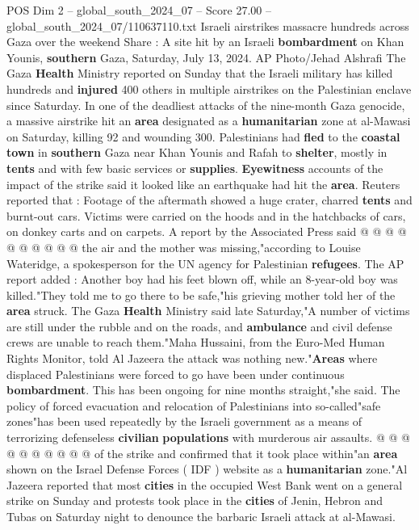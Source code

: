 \begin{textsample}{POS Dim 2 – global\_south\_2024\_07 – Score 27.00 – global\_south\_2024\_07/110637110.txt}  \label{ex:f2_pos_164}
Israeli airstrikes massacre hundreds across Gaza over the weekend Share : A site hit by an Israeli \textbf{bombardment} on Khan Younis, \textbf{southern} Gaza, Saturday, July 13, 2024.
AP Photo/Jehad Alshrafi The Gaza \textbf{Health} Ministry reported on Sunday that the Israeli military has killed hundreds and \textbf{injured} 400 others in multiple airstrikes on the Palestinian enclave since Saturday.
In one of the deadliest attacks of the nine-month Gaza genocide, a massive airstrike hit an \textbf{area} designated as a \textbf{humanitarian} zone at al-Mawasi on Saturday, killing 92 and wounding 300.
Palestinians had \textbf{fled} to the \textbf{coastal} \textbf{town} in \textbf{southern} Gaza near Khan Younis and Rafah to \textbf{shelter}, mostly in \textbf{tents} and with few basic services or \textbf{supplies}. \textbf{Eyewitness} accounts of the impact of the strike said it looked like an earthquake had hit the \textbf{area}.
Reuters reported that : Footage of the aftermath showed a huge crater, charred \textbf{tents} and burnt-out cars.
Victims were carried on the hoods and in the hatchbacks of cars, on donkey carts and on carpets.
A report by the Associated Press said @ @ @ @ @ @ @ @ @ @ the air and the mother was missing,"according to Louise Wateridge, a spokesperson for the UN agency for Palestinian \textbf{refugees}.
The AP report added : Another boy had his feet blown off, while an 8-year-old boy was killed."They told me to go there to be safe,"his grieving mother told her of the \textbf{area} struck.
The Gaza \textbf{Health} Ministry said late Saturday,"A number of victims are still under the rubble and on the roads, and \textbf{ambulance} and civil defense crews are unable to reach them."Maha Hussaini, from the Euro-Med Human Rights Monitor, told Al Jazeera the attack was nothing new."\textbf{Areas} where displaced Palestinians were forced to go have been under continuous \textbf{bombardment}.
This has been ongoing for nine months straight,"she said.
The policy of forced evacuation and relocation of Palestinians into so-called"safe zones"has been used repeatedly by the Israeli government as a means of terrorizing defenseless \textbf{civilian} \textbf{populations} with murderous air assaults. @ @ @ @ @ @ @ @ @ @ of the strike and confirmed that it took place within"an \textbf{area} shown on the Israel Defense Forces ( IDF ) website as a \textbf{humanitarian} zone."Al Jazeera reported that most \textbf{cities} in the occupied West Bank went on a general strike on Sunday and protests took place in the \textbf{cities} of Jenin, Hebron and Tubas on Saturday night to denounce the barbaric Israeli attack at al-Mawasi.

\end{textsample}
